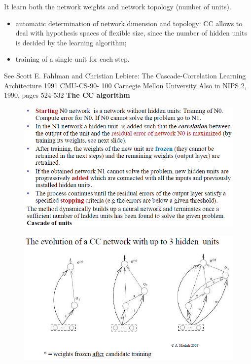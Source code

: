 \documentclass[../main.tex]{subfiles}
\begin{document}
It learn both the network weights and network topology (number of units).
\begin{itemize}
    \item automatic determination of network dimension and topology: CC allows to deal with hypothesis spaces of flexible size, since the number of hidden units is decided by the learning algorithm;
    \item training of a single unit for each step.
\end{itemize}
See Scott E. Fahlman and Christian Lebiere:
The Cascade-Correlation Learning Architecture 1991 CMU-CS-90-
100 Carnegie Mellon University Also in NIPS 2, 1990, pages 524-532
\newpage
\textbf{The CC algorithm}
\begin{figure}[H]
    \centering
    \includegraphics[scale = 0.74]{lectures/4_neural_networks/4_cc_alg.png}
    \label{fig:4_cc_alg}
\end{figure}
\begin{figure}[H]
    \centering
    \includegraphics[scale = 0.74]{lectures/4_neural_networks/4_cc_ex.png}
    \label{fig:4_cc_ex}
\end{figure}
\end{document}
